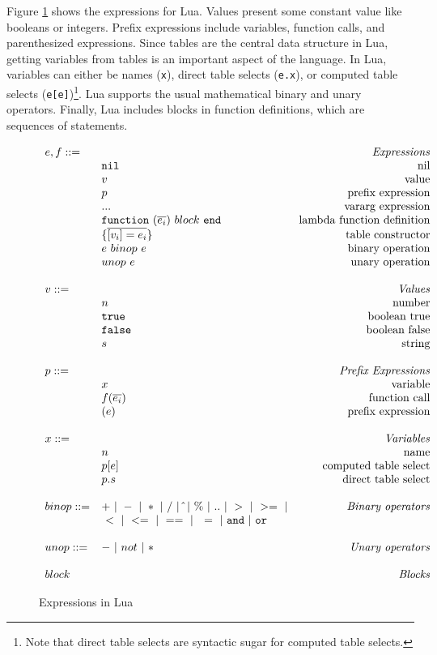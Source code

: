 Figure \ref{fig:LuaExp} shows the expressions for Lua.
Values present some constant value like booleans or integers.
Prefix expressions include variables, function calls, and parenthesized expressions.
Since tables are the central data structure in Lua,
getting variables from tables is an important aspect of the language.
In Lua, variables can either be names ({\tt x}), direct table selects ({\tt e.x}), or computed table selects ({\tt e[e]})\footnote{
Note that direct table selects are syntactic sugar for computed table selects.
}.
Lua supports the usual mathematical binary and unary operators.
Finally, Lua includes blocks in function definitions, which are sequences of statements.

\newcommand{\mydefhead}[2]{\multicolumn{2}{l}{{#1}}&\mbox{\emph{#2}}\\}
\newcommand{\mydefcase}[2]{\qquad\qquad& #1 &\mbox{#2}\\}

\newcommand{\functiondef}[2]{\mbox{\tt function}~(\overline{#1_i})~#2~ {\tt end}}


\begin{figure}
\caption{Expressions in Lua}
\label{fig:LuaExp}
\[
\begin{array}{llr}
  \mydefhead{e,f ::=\qquad\qquad\qquad\qquad}{Expressions}
  \mydefcase{\tt nil}{nil}
  \mydefcase{v}{value}
  \mydefcase{p}{prefix expression}
  \mydefcase{\tt ...}{vararg expression}
  \mydefcase{\functiondef e {block}}{lambda function definition}
  \mydefcase{\{\overline{[v_i] = e_i}\}}{table constructor}
  \mydefcase{e ~binop~ e}{binary operation}
  \mydefcase{unop~ e}{unary operation}
  \\
  \mydefhead{v ::=\qquad\qquad\qquad\qquad}{Values}
  \mydefcase{n}{number}
  \mydefcase{\tt true}{boolean true}
  \mydefcase{\tt false}{boolean false}
  \mydefcase{s}{string}
  \\
  \mydefhead{p ::=\qquad\qquad\qquad\qquad}{Prefix Expressions}
  \mydefcase{x}{variable}
  \mydefcase{f(\overline{e_i})}{function call}
  \mydefcase{(e)}{prefix expression}
  
  \\
  \mydefhead{x ::=\qquad\qquad\qquad\qquad}{Variables}
  \mydefcase{n}{name}
  \mydefcase{p[e]}{computed table select}
  \mydefcase{p.s}{direct table select}
  \\
  binop ::= & + ~|~ - ~|~ * ~|~ / ~|~ \hat{} ~|~ \% ~|~ .. ~|~ > ~|~ >= ~|& \mbox{\emph{Binary operators}}\\
  \quad & ~ < ~|~ <= ~|~ == ~|~ ~= ~|~ {\tt and} ~|~ {\tt or} &  \\
  \\
  unop ::= & - ~|~ not ~|~ *  & \mbox{\emph{Unary operators}} \\
  \\
  \mydefhead{block \qquad\qquad\qquad\qquad}{Blocks}
\end{array}
\]
\end{figure}



